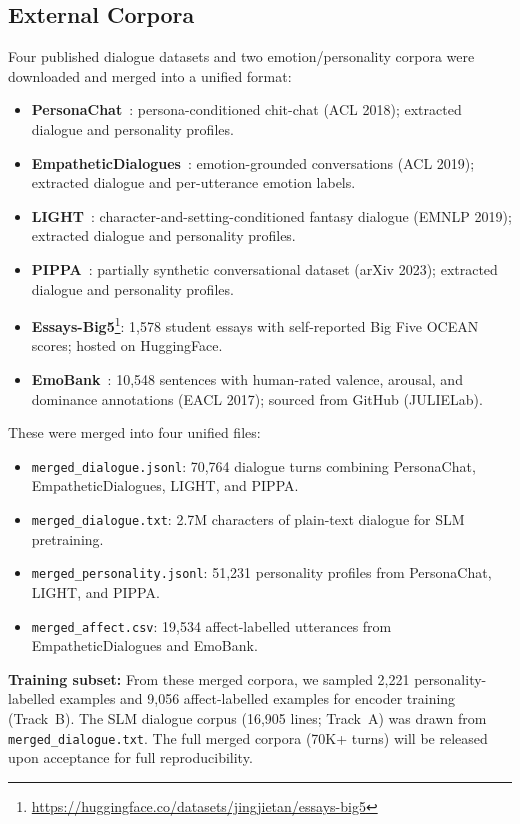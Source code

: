 \documentclass[11pt]{article}
\begin{document}
\subsection{External Corpora}

Four published dialogue datasets and two emotion/personality corpora were downloaded and merged into a unified format:

\begin{itemize}
    \item \textbf{PersonaChat}~\cite{zhang2018personalizing}: persona-conditioned chit-chat (ACL 2018); extracted dialogue and personality profiles.
    \item \textbf{EmpatheticDialogues}~\cite{rashkin2019empathetic}: emotion-grounded conversations (ACL 2019); extracted dialogue and per-utterance emotion labels.
    \item \textbf{LIGHT}~\cite{urbanek2019learning}: character-and-setting-conditioned fantasy dialogue (EMNLP 2019); extracted dialogue and personality profiles.
    \item \textbf{PIPPA}~\cite{gosmar2022pippa}: partially synthetic conversational dataset (arXiv 2023); extracted dialogue and personality profiles.
    \item \textbf{Essays-Big5}\footnote{\url{https://huggingface.co/datasets/jingjietan/essays-big5}}: 1,578 student essays with self-reported Big Five OCEAN scores; hosted on HuggingFace.
    \item \textbf{EmoBank}~\cite{buechel2017emobank}: 10,548 sentences with human-rated valence, arousal, and dominance annotations (EACL 2017); sourced from GitHub (JULIELab).
\end{itemize}

These were merged into four unified files:
\begin{itemize}
    \item \texttt{merged\_dialogue.jsonl}: 70,764 dialogue turns combining PersonaChat, EmpatheticDialogues, LIGHT, and PIPPA.
    \item \texttt{merged\_dialogue.txt}: 2.7M characters of plain-text dialogue for SLM pretraining.
    \item \texttt{merged\_personality.jsonl}: 51,231 personality profiles from PersonaChat, LIGHT, and PIPPA.
    \item \texttt{merged\_affect.csv}: 19,534 affect-labelled utterances from EmpatheticDialogues and EmoBank.
\end{itemize}

\textbf{Training subset:} From these merged corpora, we sampled 2,221 personality-labelled examples and 9,056 affect-labelled examples for encoder training (Track~B).
The SLM dialogue corpus (16,905 lines; Track~A) was drawn from \texttt{merged\_dialogue.txt}.
The full merged corpora (70K+ turns) will be released upon acceptance for full reproducibility.
\end{document}
